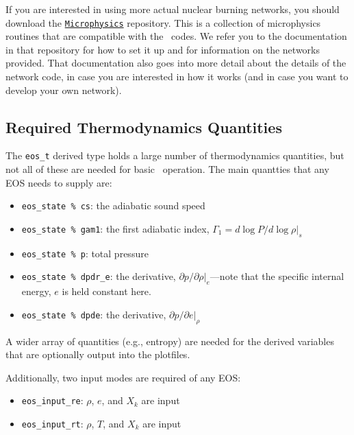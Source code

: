 If you are interested in using more actual nuclear burning networks,
you should download the \href{https://github.com/BoxLib-Codes/Microphysics}{\tt Microphysics} 
repository. This is a collection of microphysics routines that are compatible with the 
\boxlib\ codes. We refer you to the documentation in that repository for how to set it up 
and for information on the networks provided. That documentation 
also goes into more detail about the details of the network code, in case you are interested in 
how it works (and in case you want to develop your own network).

\subsection{Required Thermodynamics Quantities}

The {\tt eos\_t} derived type holds a large number of thermodynamics
quantities, but not all of these are needed for basic
\castro\ operation.  The main quantties that any EOS needs to
supply are:
\begin{itemize}
  \item {\tt eos\_state \% cs}: the adiabatic sound speed
  \item {\tt eos\_state \% gam1}: the first adiabatic index, 
       $\Gamma_1 = d\log P / d\log \rho |_s$
  \item {\tt eos\_state \% p}: total pressure
  \item {\tt eos\_state \% dpdr\_e}: the derivative, $\partial
    p/\partial \rho |_e$---note that the specific internal energy, $e$
    is held constant here.
  \item {\tt eos\_state \% dpde}: the derivative, $\partial p /
    \partial e |_\rho$
\end{itemize}

A wider array of quantities (e.g., entropy) are needed for the derived
variables that are optionally output into the plotfiles.

Additionally, two input modes are required of any EOS:
\begin{itemize}
\item {\tt eos\_input\_re}: $\rho$, $e$, and $X_k$ are input
\item {\tt eos\_input\_rt}: $\rho$, $T$, and $X_k$ are input
\end{itemize}
